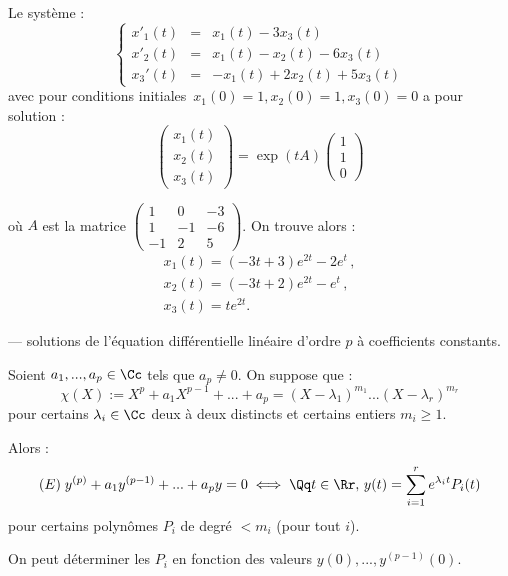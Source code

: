 \documentclass[class=report,crop=false]{standalone}
\begin{document}
\begin{exemple}
Le système :
\[\left\{\begin{array}{lcl}
x'_1(t) &= & x_1(t) -3x_3(t)\\
x'_2(t) & = & x_1(t) - x_2(t) - 6x_3(t)\\
x_3'(t) & = & -x_1(t)+2x_2(t) + 5x_3(t)
\end{array}\right.\]
avec pour \og conditions initiales\fg\ $x_1(0) = 1,x_2(0) = 1, x_3(0) = 0$ a pour solution :
\[\left(\begin{array}{c}
x_1(t)\\
x_2(t)\\
x_3(t)
\end{array}\right) = \exp ( tA) \left(\begin{array}{c}
1\\
1\\
0
\end{array}\right)\]

où $A$ est la matrice $\left(\begin{array}{ccc}
1 & 0 & -3\\
1&-1&-6\\
-1&2&5
\end{array}\right)$. 
On trouve alors :
\[\begin{array}{l}
x_1(t) = (-3t+3)e^{2t}-2e^t\,,\\
x_2(t) = (-3t+2)e^{2t}-e^t\,,\\
x_3(t) = te^{2t}.
\end{array}\]
\end{exemple}

--- solutions de l'équation différentielle linéaire d'ordre $p$ à coefficients constants.


\begin{corollaire}
Soient $a_1,...,a_p \in \Cc$ tels que $a_p\neq 0$. On suppose que :
\[\chi(X):= X^p+a_1X^{p-1}+... +a_p =(X-\lambda_1)^{m_1}...(X-\lambda_r)^{m_r}\]
pour certains $\lambda_i \in \Cc$ deux à deux distincts et certains entiers $m_i \ge 1$.

Alors :
\[(E) \; y^{(p)} +a_1y^{(p-1)} + ... +a_p y = 0 \iff \Qq t\in \Rr, \, y(t) = \sum_{i=1}^r e^{\lambda_it}P_i(t)\]
pour certains polynômes $P_i$ de degré $< m_i$ (pour tout $i$).
\end{corollaire}

\begin{remarque*}
On peut déterminer les $P_i$ en fonction des valeurs $y(0),...,y^{(p-1)}(0)$.
\end{remarque*}
\end{document}
